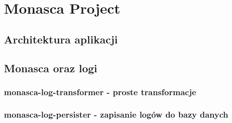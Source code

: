 \chapter[Przykładowa aplikacja]{Monasca Project}
\label{chapter:monasca}

\section{Architektura aplikacji}
\clearpage 
\section{Monasca oraz logi}
\clearpage 
\clearpage 
\subsection{monasca-log-transformer - proste transformacje}
\subsection{monasca-log-persister - zapisanie logów do bazy danych}